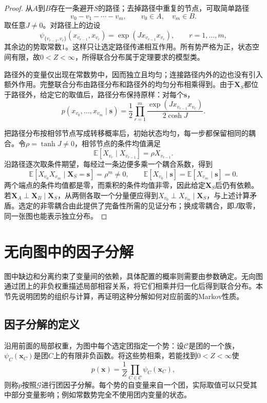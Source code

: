 \begin{proof}
从$A$到$B$存在一条避开$S$的路径；去掉路径中重复的节点，可取简单路径
\[
  v_0-v_1-\cdots-v_m,
  \qquad v_0\in A,\quad v_m\in B.
\]
取任意$J\neq0$。对路径上的边设
\[
  \psi_{\{v_{r-1},v_r\}}(x_{v_{r-1}},x_{v_r})
  =\exp(Jx_{v_{r-1}}x_{v_r}),
  \qquad r=1,\ldots,m,
\]
其余边的势取常数$1$。这样只让选定路径传递相互作用。所有势严格为正，状态空间有限，故$0<Z<\infty$，所得联合分布属于定理要求的模型类。

路径外的变量仅出现在常数势中，因而独立且均匀；连接路径内外的边也没有引入额外作用。完整联合分布由路径分布和路径外的均匀分布相乘得到。由于$\bm{X}_S$都位于路径外，给定它的取值后，路径分布保持原样：对每个$\bm{s}$，
\[
  p(x_{v_0},\ldots,x_{v_m}\mid\bm{s})
  =\frac12\prod_{r=1}^{m}
    \frac{\exp(Jx_{v_{r-1}}x_{v_r})}{2\cosh J}.
\]

把路径分布按相邻节点写成转移概率后，初始状态均匀，每一步都保留相同的耦合。令$\rho=\tanh J\neq0$，相邻节点的条件均值满足
\[
  \mathbb{E}[X_{v_r}\mid X_{v_{r-1}}]
  =\rho X_{v_{r-1}}.
\]
沿路径逐次取条件期望，每经过一条边便多乘一个耦合系数，得到
\[
  \mathbb{E}[X_{v_0}X_{v_m}\mid\bm{X}_S=\bm{s}]
  =\rho^m\neq0,
  \qquad
  \mathbb{E}[X_{v_0}\mid\bm{s}]
  =\mathbb{E}[X_{v_m}\mid\bm{s}]=0.
\]
两个端点的条件均值都是零，而乘积的条件均值非零，因此给定$\bm{X}_S$后仍有依赖。若$\bm{X}_A\perp\bm{X}_B\mid\bm{X}_S$，从两侧各取一个分量便应得到$X_{v_0}\perp X_{v_m}\mid\bm{X}_S$，与上述计算矛盾。选定的非零耦合由此提供了完备性所需的见证分布；换成零耦合，即$J$取零，同一张图也能表示独立分布。
\end{proof}

\section{无向图中的因子分解}
\label{sec:pgm-undirected-factorization}

图中缺边和分离约束了变量间的依赖，具体配置的概率则需要由参数确定。无向图通过团上的非负权重描述局部相容关系，将它们相乘并归一化后得到联合分布。本节先说明团势的组织与计算，再证明这种分解如何对应前面的Markov性质。

\subsection{因子分解的定义}
\label{sec:pgm-undirected-factorization-definition}

沿用前面的局部权重，为图中每个选定团指定一个势：设$\mathcal{C}$是团的一个族，$\psi_C(\bm{x}_C)$是团$C$上的有限非负函数。将这些势相乘，若能找到$0<Z<\infty$使
\begin{equation}
  p(\bm{x})=\frac{1}{Z}\prod_{C\in\mathcal{C}}\psi_C(\bm{x}_C),
  \label{eq:pgm-undirected-factorization}
\end{equation}
则称$p$按照$\mathcal{G}$进行团因子分解。每个势的自变量来自一个团，实际取值可以只受其中部分变量影响；例如常数势完全不使用团内变量的状态。

